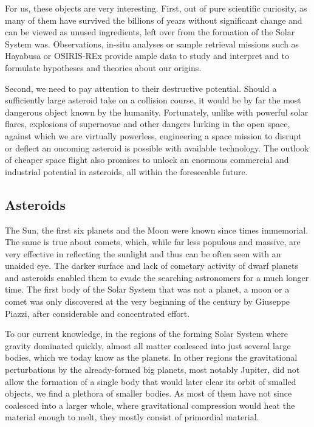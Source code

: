     For us, these objects are very interesting. First, out of pure scientific curiosity, as many of them
    have survived the billions of years without significant change and can be viewed
    as unused ingredients, left over from the formation of the Solar System was.
    Observations, in-situ analyses or sample retrieval missions such as Hayabusa or OSIRIS-REx
    provide ample data to study and interpret and to formulate hypotheses and theories about our origins.

    Second, we need to pay attention to their destructive potential.
    Should a sufficiently large asteroid take on a collision course,
    it would be by far the most dangerous object known by the humanity.
    Fortunately, unlike with powerful solar flares, explosions of supernovae and other
    dangers lurking in the open space, against which we are virtually powerless,
    engineering a space mission to disrupt or deflect an oncoming asteroid is possible with available technology.
    The outlook of cheaper space flight also promises to unlock an enormous
    commercial and industrial potential in asteroids, all within the foreseeable future.

    \subsection{Asteroids} \label{iaa}
        The Sun, the first six planets and the Moon were known since times immemorial.
        The same is true about comets, which, while far less populous and massive,
        are very effective in reflecting the sunlight and thus can be often seen with an unaided eye.
        The darker surface and lack of cometary activity of dwarf planets and asteroids enabled them
        to evade the searching astronomers for a much longer time.
        The first body of the Solar System that was not a planet, a moon or a comet was only discovered at
        the very beginning of the  century by Giuseppe Piazzi, after considerable and concentrated effort.

        To our current knowledge, in the regions of the forming Solar System where gravity dominated quickly,
        almost all matter coalesced into just several large bodies, which we today know as the planets.
        In other regions the gravitational perturbations by the already-formed big planets, most notably Jupiter,
        did not allow the formation of a single body that would later clear its orbit of smalled objects,
        we find a plethora of smaller bodies. As most of them have not since coalesced into a larger whole,
        where gravitational compression would heat the material enough to melt, they mostly consist of primordial material.


